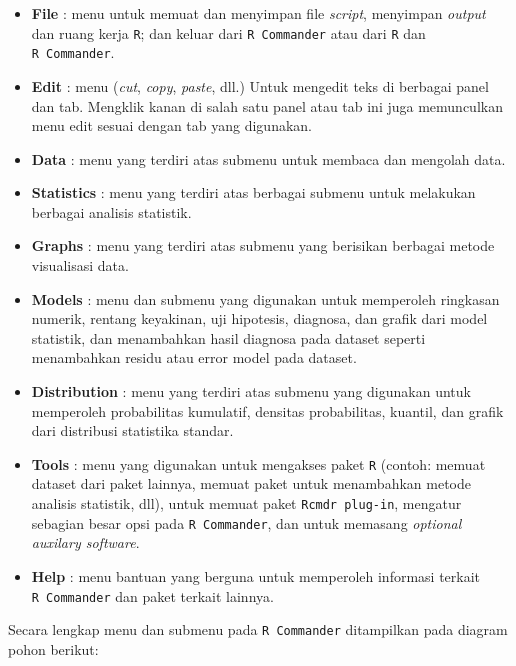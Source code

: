 \documentclass[12pt,]{krantz}
\providecommand{\tightlist}{%
  \setlength{\itemsep}{0pt}\setlength{\parskip}{0pt}}
\begin{document}
\begin{itemize}
\tightlist
\item
  \textbf{File} : menu untuk memuat dan menyimpan file \emph{script}, menyimpan \emph{output} dan ruang kerja \texttt{R}; dan keluar dari \texttt{R\ Commander} atau dari \texttt{R} dan \texttt{R\ Commander}.
\item
  \textbf{Edit} : menu (\emph{cut}, \emph{copy}, \emph{paste}, dll.) Untuk mengedit teks di berbagai panel dan tab. Mengklik kanan di salah satu panel atau tab ini juga memunculkan menu edit sesuai dengan tab yang digunakan.
\item
  \textbf{Data} : menu yang terdiri atas submenu untuk membaca dan mengolah data.
\item
  \textbf{Statistics} : menu yang terdiri atas berbagai submenu untuk melakukan berbagai analisis statistik.
\item
  \textbf{Graphs} : menu yang terdiri atas submenu yang berisikan berbagai metode visualisasi data.
\item
  \textbf{Models} : menu dan submenu yang digunakan untuk memperoleh ringkasan numerik, rentang keyakinan, uji hipotesis, diagnosa, dan grafik dari model statistik, dan menambahkan hasil diagnosa pada dataset seperti menambahkan residu atau error model pada dataset.
\item
  \textbf{Distribution} : menu yang terdiri atas submenu yang digunakan untuk memperoleh probabilitas kumulatif, densitas probabilitas, kuantil, dan grafik dari distribusi statistika standar.
\item
  \textbf{Tools} : menu yang digunakan untuk mengakses paket \texttt{R} (contoh: memuat dataset dari paket lainnya, memuat paket untuk menambahkan metode analisis statistik, dll), untuk memuat paket \texttt{Rcmdr\ plug-in}, mengatur sebagian besar opsi pada \texttt{R\ Commander}, dan untuk memasang \emph{optional auxilary software}.
\item
  \textbf{Help} : menu bantuan yang berguna untuk memperoleh informasi terkait \texttt{R\ Commander} dan paket terkait lainnya.
\end{itemize}

Secara lengkap menu dan submenu pada \texttt{R\ Commander} ditampilkan pada diagram pohon berikut:
\end{document}
